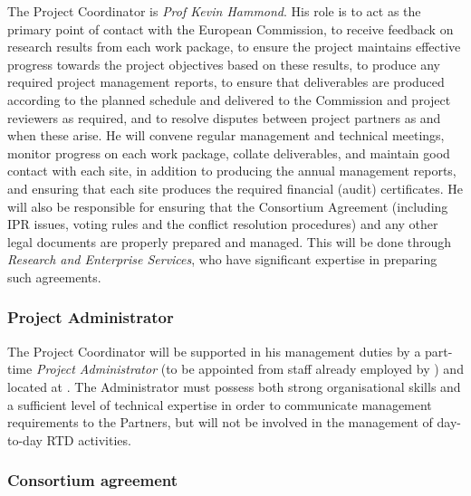 \documentclass[a4paper,11pt]{article}
\begin{document}
The Project Coordinator is \emph{Prof Kevin Hammond}.  His role
is to act as the primary point of contact with the European
Commission, to receive feedback on research results from each
work package, to ensure the project maintains effective
progress towards the project objectives based on these results,
to produce any required  project management reports, to ensure
that deliverables are produced according to the planned
schedule and delivered to the Commission and project reviewers
as required, and to resolve disputes between project partners
as and when these arise.  He will convene regular management
and technical meetings, monitor progress on each work package,
collate deliverables, and maintain good contact with each site,
in addition to producing the annual management reports, and
ensuring that each site produces the required financial (audit)
certificates.  He will also be responsible for ensuring that
the Consortium Agreement (including IPR issues, voting rules and the conflict resolution procedures)
and any other legal documents are properly prepared and managed. This will be
done through \SAshort{} \emph{Research and Enterprise
Services}, who have significant expertise in preparing such
agreements.

\vspace{12pt}
\subsubsection*{Project Administrator}
\vspace{-6pt}

The Project Coordinator will be supported in his management
duties by a part-time \emph{Project Administrator} (to be appointed
from staff already employed by \SA{}) and located at \SA{}.  The Administrator
must possess both strong organisational skills and a
sufficient level of technical expertise in order to communicate
management requirements to the Partners, but will not be
involved in the management of day-to-day RTD activities.

\vspace{12pt}
\subsubsection*{Consortium agreement}
\vspace{-6pt}


\end{document}
